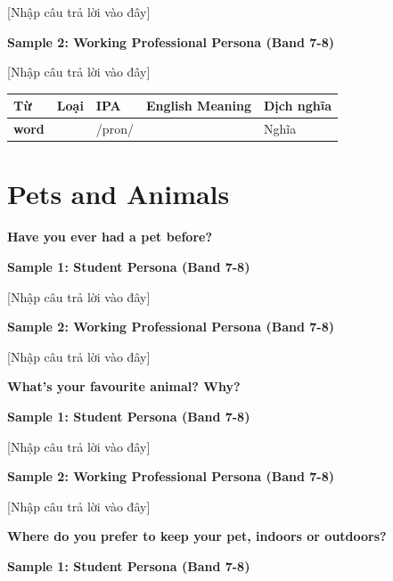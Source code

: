 [Nhập câu trả lời vào đây]

\textbf{Sample 2: Working Professional Persona (Band 7-8)}

[Nhập câu trả lời vào đây]

\separator


\vspace{0.8em}
\begin{center}
\renewcommand{\arraystretch}{1.65}
\begin{tabularx}{\textwidth}{|V{0.22\textwidth}|C{0.07\textwidth}|I{0.20\textwidth}|Y|V{0.18\textwidth}|}
\hline
{}
\textbf{Từ} & \textbf{Loại} & \textbf{IPA} & \textbf{English Meaning} & \textbf{Dịch nghĩa} \\
\hline
\textbf{word} &  & /pron/ &  & Nghĩa \\ \hline
\end{tabularx}
\end{center}

\newpage

\section{Pets and Animals}
\begin{ieltsquestion}
\textbf{Have you ever had a pet before?}
\end{ieltsquestion}
\textbf{Sample 1: Student Persona (Band 7-8)}

[Nhập câu trả lời vào đây]

\textbf{Sample 2: Working Professional Persona (Band 7-8)}

[Nhập câu trả lời vào đây]

\separator

\begin{ieltsquestion}
\textbf{What's your favourite animal? Why?}
\end{ieltsquestion}
\textbf{Sample 1: Student Persona (Band 7-8)}

[Nhập câu trả lời vào đây]

\textbf{Sample 2: Working Professional Persona (Band 7-8)}

[Nhập câu trả lời vào đây]

\separator

\begin{ieltsquestion}
\textbf{Where do you prefer to keep your pet, indoors or outdoors?}
\end{ieltsquestion}
\textbf{Sample 1: Student Persona (Band 7-8)}

